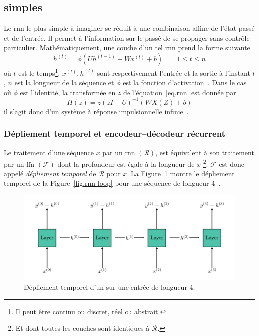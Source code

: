 \subsection{ simples}

Le \gls{rnn} le plus simple à imaginer se réduit à une combinaison affine de l'état passé et de l'entrée.
Il permet à l'information sur le passé de se propager sans contrôle particulier.
Mathématiquement, une couche d'un tel \gls{rnn} prend la forme suivante 
\begin{equation}
    \label{eq.rnn}
    h^{(t)} = \phi\left(Uh^{(t-1)} + Wx^{(t)} + b\right) \qquad 1 \le t \le n
\end{equation}
où \(t\) est le temps\footnote{Il peut être continu ou discret, réel ou abstrait.},
\(x^{(t)}, h^{(t)}\) sont respectivement l'entrée et la sortie à l'instant \(t\), 
\(n\) est la longueur de la séquence et \(\phi\) est la fonction d'activation~\cite{Fathi_2021}.
Dans le cas où \(\phi\) est l'identité,  
la transformée en \(z\) de l'équation~\ref{eq.rnn} est donnée par 
\begin{equation}
    \label{eq.rnn-tz}
    H(z) = z\left(zI - U\right)^{-1} \left(WX(Z) + b\right)
\end{equation}
il s'agit donc d'un système à réponse impulsionnelle infinie~\cite{Fathi_2021}.

\subsubsection{Dépliement temporel et encodeur--décodeur récurrent}

Le traitement d'une séquence \(x\) par un \gls{rnn} \((\mathcal{R})\), 
est équivalent à son traitement par un \gls{ffn} \((\mathcal{F})\) dont la profondeur est égale à la longueur de \(x\)%
\footnote{Et dont toutes les couches sont identiques à \(\mathcal{R}\).}.
\(\mathcal{F}\) est donc appelé \emph{dépliement temporel} de \(\mathcal{R}\) pour \(x\).
La Figure~\ref{fig.rnn-unfold} montre le dépliement temporel de la Figure~\ref{fig.rnn-loop} 
pour une séquence de longueur 4~\cite{LeCun_Bengio_Hinton_2015}.

\begin{figure}[hbt]
    \centering
    \includegraphics[width=\textwidth]{assets/images/rnn-unfolding.png}
    \caption{Dépliement temporel d'un  sur une entrée de longueur 4.}
    \label{fig.rnn-unfold}
\end{figure}

